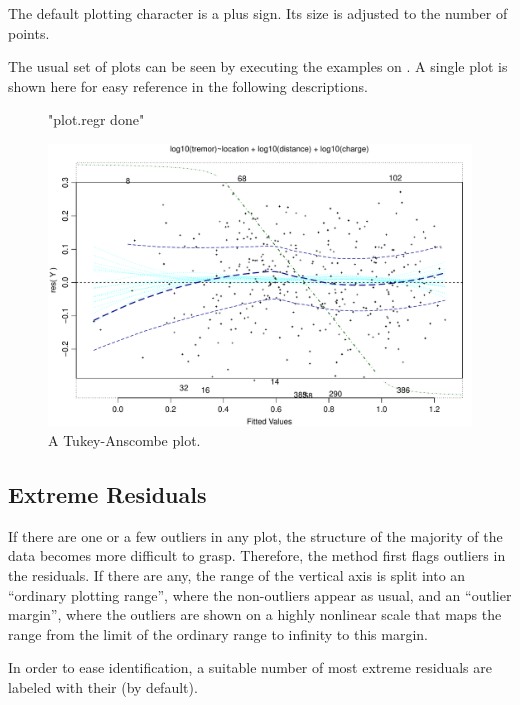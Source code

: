\documentclass[11pt]{article}
\begin{document}
The default plotting character is a plus sign. Its size is adjusted to
the number of points.

The usual set of plots can be seen by executing the examples on
. 
A single plot is shown here for easy reference in the following
descriptions. 

\begin{figure}[htb]
\begin{Schunk}
\begin{Soutput}
[1] "plot.regr done"
\end{Soutput}
\end{Schunk}
\includegraphics{regr-description-taplot}
\caption{A Tukey-Anscombe plot.}
\end{figure}

\subsection{Extreme Residuals}
If there are one or a few outliers in any plot, the structure of the
majority of the data becomes more difficult to grasp. 
Therefore, the  method first flags outliers in the residuals.
If there are any, the range of the vertical axis is split into an
``ordinary plotting range'', where the non-outliers appear as usual, and
an ``outlier margin'', where the outliers are shown on a highly nonlinear
scale that maps the range from the limit of the ordinary range to infinity 
to this margin.

In order to ease identification, a suitable number of most extreme
residuals are labeled with their  (by default).

\end{document}

